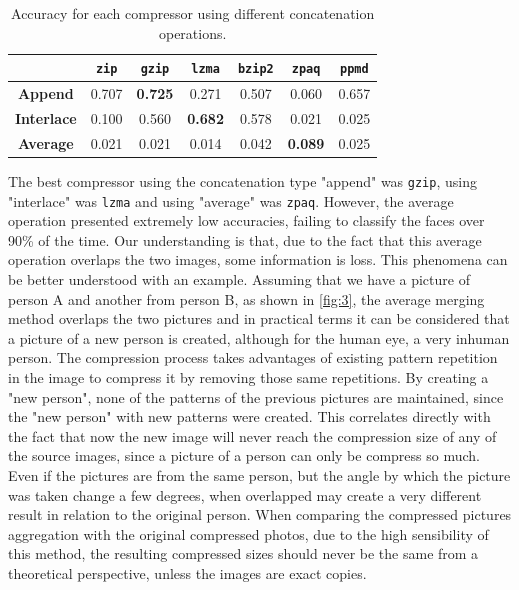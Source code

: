 \documentclass[12pt]{article}
\begin{document}
\begin{table}[h!]
\centering
\begin{tabular}{@{}c|cccccc@{}}
                   & \textbf{\texttt{zip}} & \textbf{\texttt{gzip}} & \textbf{\texttt{lzma}} & \textbf{\texttt{bzip2}} & \textbf{\texttt{zpaq}} & \textbf{\texttt{ppmd}}\\ \midrule
\textbf{Append}    & 0.707     & \textbf{0.725}   & 0.271           & 0.507     & 0.060           & 0.657 \\
\textbf{Interlace} & 0.100     & 0.560            & \textbf{0.682}  & 0.578     & 0.021           & 0.025 \\ 
\textbf{Average}   & 0.021     & 0.021            & 0.014           & 0.042     & \textbf{0.089}  & 0.025 \\ 
\end{tabular}
\vspace{5pt}
\caption{Accuracy for each compressor using different concatenation operations.}
\label{tab:1}
\end{table}

The best compressor using the concatenation type "append" was \texttt{gzip}, using "interlace" was \texttt{lzma} and using "average" was \texttt{zpaq}.
However, the average operation presented extremely low accuracies, failing to classify the faces over 90\% of the time.
Our understanding is that, due to the fact that this average operation overlaps the two images, some information is loss. This phenomena can be better understood with an example. Assuming that we have a picture of person A and another from person B, as shown in \ref{fig:3}, the average merging method overlaps the two pictures and in practical terms it can be considered that a picture of a new person is created, although for the human eye, a very inhuman person. The compression process takes advantages of existing pattern repetition in the image to compress it by removing those same repetitions. By creating a "new person", none of the patterns of the previous pictures are maintained, since the "new person" with new patterns were created. This correlates directly with the fact that now the new image will never reach the compression size of any of the source images, since a picture of a person can only be compress so much. Even if the pictures are from the same person, but the angle by which the picture was taken change a few degrees, when overlapped may create a very different result in relation to the original person. When comparing the compressed pictures aggregation with the original compressed photos, due to the high sensibility of this method, the resulting compressed sizes should never be the same from a theoretical perspective, unless the images are exact copies.
\end{document}
